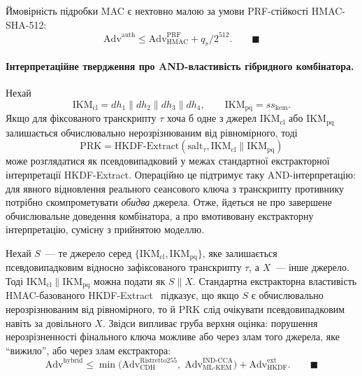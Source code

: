 \documentclass{llncs}
\begin{document}
\begin{utheorem}
Ймовірність підробки MAC є нехтовно малою за умови PRF-стійкості
HMAC-SHA-512:
\[
  \mathrm{Adv}^{\mathrm{auth}} \leq
  \mathrm{Adv}_{\mathrm{HMAC}}^{\mathrm{PRF}} + q_s / 2^{512}.
  \qquad \blacksquare
\]
\end{utheorem}

\paragraph{Інтерпретаційне твердження про AND-властивість гібридного комбінатора.}
Нехай
\[
  \mathrm{IKM}_{\mathrm{cl}} = dh_1 \| dh_2 \| dh_3 \| dh_4,\qquad
  \mathrm{IKM}_{\mathrm{pq}} = ss_{\mathrm{kem}}.
\]
Якщо для фіксованого транскрипту $\tau$ хоча б одне з джерел
$\mathrm{IKM}_{\mathrm{cl}}$ або $\mathrm{IKM}_{\mathrm{pq}}$
залишається обчислювально нерозрізнюваним від рівномірного, тоді
\[
  \mathrm{PRK} =
  \mathrm{HKDF\text{-}Extract}(\mathrm{salt}_{\tau},
  \mathrm{IKM}_{\mathrm{cl}} \| \mathrm{IKM}_{\mathrm{pq}})
\]
може розглядатися як псевдовипадковий у межах стандартної
екстракторної інтерпретації HKDF-Extract. Операційно це підтримує таку
AND-інтерпретацію: для явного відновлення реального сеансового ключа з
транскрипту противнику потрібно
скомпрометувати \emph{обидва} джерела. Отже, йдеться не про завершене
обчислювальне доведення комбінатора, а про вмотивовану екстракторну
інтерпретацію, сумісну з прийнятою моделлю.

\begin{sketchproof}
Нехай $S$~--- те джерело серед
$\{\mathrm{IKM}_{\mathrm{cl}}, \mathrm{IKM}_{\mathrm{pq}}\}$, яке
залишається псевдовипадковим відносно зафіксованого транскрипту
$\tau$, а $X$~--- інше джерело. Тоді
$\mathrm{IKM}_{\mathrm{cl}} \| \mathrm{IKM}_{\mathrm{pq}}$ можна подати
як $S \| X$. Стандартна екстракторна властивість
HMAC-базованого HKDF-Extract~\cite{krawczyk2010} підказує, що якщо $S$
є обчислювально нерозрізнюваним від рівномірного, то й
$\mathrm{PRK}$ слід очікувати псевдовипадковим навіть за довільного
$X$. Звідси випливає груба верхня оцінка: порушення нерозрізненності
фінального ключа можливе або через злам того джерела, яке ``вижило'', або через злам
екстрактора:
\[
  \mathrm{Adv}^{\mathrm{hybrid}} \leq
  \min\!\bigl(\mathrm{Adv}_{\mathrm{CDH}}^{\mathrm{Ristretto255}},\;
  \mathrm{Adv}_{\mathrm{ML\text{-}KEM}}^{\mathrm{IND\text{-}CCA}}\bigr)
  + \mathrm{Adv}_{\mathrm{HKDF}}^{\mathrm{ext}}.
  \qquad \blacksquare
\]
\end{sketchproof}
\end{document}
